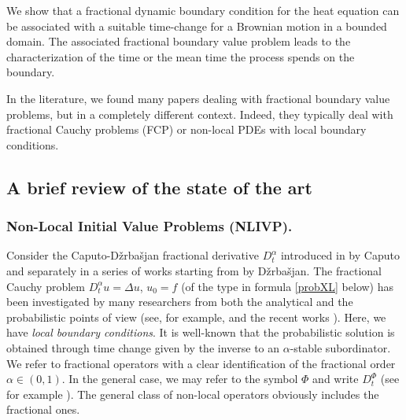 \documentclass[11pt,a4paper]{article}
\begin{document}
We show that a fractional dynamic boundary condition for the heat equation can be associated with a suitable time-change for a Brownian motion in a bounded domain. The associated fractional boundary value problem leads to the characterization of the time or the mean time the process spends on the boundary. 

In the literature, we found many papers dealing with fractional boundary value problems, but in a completely different context. Indeed, they typically deal with fractional Cauchy problems (FCP) or non-local PDEs with local boundary conditions. 

\subsection{A brief review of the state of the art}
\label{nutshell}

\subsubsection{Non-Local Initial Value Problems (NLIVP).} 

Consider the Caputo-D\v{z}rba\v{s}jan fractional derivative $D^\alpha_t$ introduced in \cite{caputoBook, CapMai71, CapMai71b}  by Caputo and separately in a series of works starting from \cite{Dzh66, DzhNers68} by D\v{z}rba\v{s}jan. The fractional Cauchy problem $D^\alpha_t u = \Delta u$, $u_0=f$ (of the type in formula \eqref{probXL} below) has been investigated by many researchers from both the analytical and the probabilistic points of view (see, for example,  \cite{BaeMee2001, Baz2000, Kiryakova94, Koc89, MLP2001, MNV09} and the recent works \cite{Dov12, GLY15, Kolo19, luchko20}). Here, we have \emph{local boundary conditions}. It is well-known that the probabilistic solution is obtained through time change given by the inverse to an $\alpha$-stable subordinator. We refer to fractional operators with a clear identification of the fractional order $\alpha \in (0,1)$. In the general case, we may refer to the symbol $\Phi$ and write $D^\Phi_t$ (see for example \cite{Chen17, Koc2011, Kolo19, Toaldo2015}). The general class of non-local operators obviously includes the fractional ones.
\end{document}
